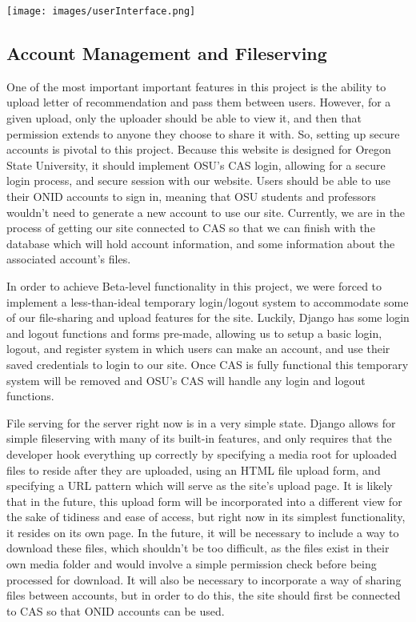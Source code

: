 \documentclass[draftclsnofoot, onecolumn, letterpaper, 10pt]{IEEEtran}
\begin{document}
\texttt{[image: images/userInterface.png]}

\subsection{Account Management and Fileserving}
One of the most important important features in this project is the ability to upload letter of recommendation and pass them between users. However, for a given upload, only the uploader should be able to view it, and then that permission extends to anyone they choose to share it with. So, setting up secure accounts is pivotal to this project. Because this website is designed for Oregon State University, it should implement OSU's CAS login, allowing for a secure login process, and secure session with our website. Users should be able to use their ONID accounts to sign in, meaning that OSU students and professors wouldn't need to generate a new account to use our site. Currently, we are in the process of getting our site connected to CAS so that we can finish with the database which will hold account information, and some information about the associated account's files.

In order to achieve Beta-level functionality in this project, we were forced to implement a less-than-ideal temporary login/logout system to accommodate some of our file-sharing and upload features for the site. Luckily, Django has some login and logout functions and forms pre-made, allowing us to setup a basic login, logout, and register system in which users can make an account, and use their saved credentials to login to our site. Once CAS is fully functional this temporary system will be removed and OSU's CAS will handle any login and logout functions.

File serving for the server right now is in a very simple state. Django allows for simple fileserving with many of its built-in features, and only requires that the developer hook everything up correctly by specifying a media root for uploaded files to reside after they are uploaded, using an HTML file upload form, and specifying a URL pattern which will serve as the site's upload page. It is likely that in the future, this upload form will be incorporated into a different view for the sake of tidiness and ease of access, but right now in its simplest functionality, it resides on its own page. In the future, it will be necessary to include a way to download these files, which shouldn't be too difficult, as the files exist in their own media folder and would involve a simple permission check before being processed for download. It will also be necessary to incorporate a way of sharing files between accounts, but in order to do this, the site should first be connected to CAS so that ONID accounts can be used.
\end{document}

